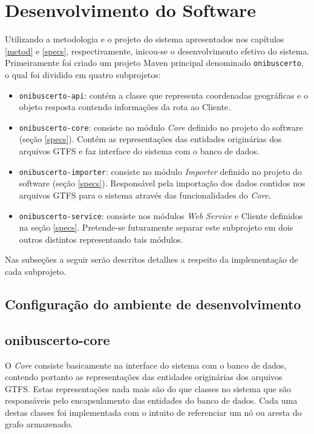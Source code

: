 \chapter{Desenvolvimento do Software}
\label{chap:desenv}

Utilizando a metodologia e o projeto do sistema apresentados nos capítulos \ref{metod} e \ref{specs}, respectivamente, inicou-se o desenvolvimento efetivo do sistema.
Primeiramente foi criado um projeto Maven principal denominado \texttt{onibuscerto}, o qual foi dividido em quatro subprojetos: 
\begin{itemize}
	\item \texttt{onibuscerto-api}: contém a classe que representa coordenadas geográficas e o objeto resposta contendo informações da rota ao Cliente.
	\item \texttt{onibuscerto-core}: consiste no módulo \emph{Core} definido no projeto do software (seção \ref{specs}). 
	Contém as representações das entidades originárias dos arquivos GTFS e faz interface do sistema com o banco de dados.
	\item \texttt{onibuscerto-importer}: consiste no módulo \emph{Importer} definido no projeto do software (seção \ref{specs}).
	Responsável pela importação dos dados contidos nos arquivos GTFS para o sistema através das funcionalidades do \emph{Core}.
	\item \texttt{onibuscerto-service}: consiste nos módulos \emph{Web Service} e Cliente definidos na seção \ref{specs}. 
	Pretende-se futuramente separar este subprojeto em dois outros distintos representando tais módulos.
\end{itemize}

Nas subseções a seguir serão descritos detalhes a respeito da implementação de cada subprojeto.

\section{Configuração do ambiente de desenvolvimento}

\section{onibuscerto-core}

O \emph{Core} consiste basicamente na interface do sistema com o banco de dados, contendo portanto as representações das entidades originárias dos arquivos GTFS.
Estas representações nada mais são do que classes no sistema que são responsáveis pelo encapsulamento das entidades do banco de dados.
Cada uma destas classes foi implementada com o intuito de referenciar um nó ou aresta do grafo armazenado. 

